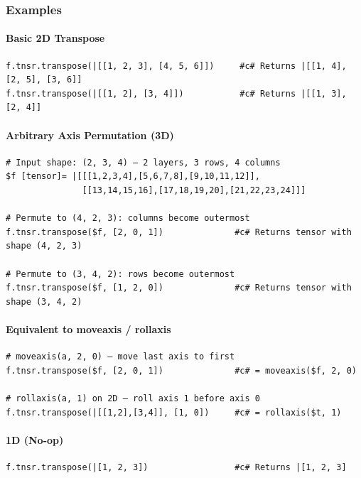 \subsubsection{Examples}

\paragraph{Basic 2D Transpose}
\begin{verbatim}
f.tnsr.transpose(|[[1, 2, 3], [4, 5, 6]])     #c# Returns |[[1, 4], [2, 5], [3, 6]]
f.tnsr.transpose(|[[1, 2], [3, 4]])           #c# Returns |[[1, 3], [2, 4]]
\end{verbatim}

\paragraph{Arbitrary Axis Permutation (3D)}
\begin{verbatim}
# Input shape: (2, 3, 4) — 2 layers, 3 rows, 4 columns
$f [tensor]= |[[[1,2,3,4],[5,6,7,8],[9,10,11,12]],
               [[13,14,15,16],[17,18,19,20],[21,22,23,24]]]

# Permute to (4, 2, 3): columns become outermost
f.tnsr.transpose($f, [2, 0, 1])              #c# Returns tensor with shape (4, 2, 3)

# Permute to (3, 4, 2): rows become outermost
f.tnsr.transpose($f, [1, 2, 0])              #c# Returns tensor with shape (3, 4, 2)
\end{verbatim}

\paragraph{Equivalent to moveaxis / rollaxis}
\begin{verbatim}
# moveaxis(a, 2, 0) — move last axis to first
f.tnsr.transpose($f, [2, 0, 1])              #c# = moveaxis($f, 2, 0)

# rollaxis(a, 1) on 2D — roll axis 1 before axis 0
f.tnsr.transpose(|[[1,2],[3,4]], [1, 0])     #c# = rollaxis($t, 1)
\end{verbatim}

\paragraph{1D (No-op)}
\begin{verbatim}
f.tnsr.transpose(|[1, 2, 3])                 #c# Returns |[1, 2, 3]
\end{verbatim}

